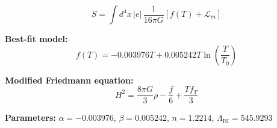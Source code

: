 
\begin{equation}
  S = \int d^4x \, |e| \, \frac{1}{16\pi G} \left[ f(T) + \mathcal{L}_m \right]
\end{equation}

\textbf{Best-fit model:}
\begin{equation}
  f(T) = -0.003976 T + 0.005242 T \ln\!\left(\frac{T}{T_0}\right)
\end{equation}

\textbf{Modified Friedmann equation:}
\begin{equation}
  H^2 = \frac{8\pi G}{3} \rho - \frac{f}{6} + \frac{T f_T}{3}
\end{equation}

\textbf{Parameters:}
$\alpha = -0.003976$, \quad
$\beta = 0.005242$, \quad
$n = 1.2214$, \quad
$\Lambda_{\text{BI}} = 545.9293$